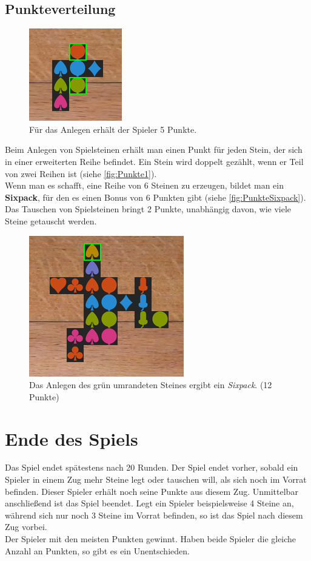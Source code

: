 \documentclass[a4paper, ngerman]{scrartcl}
\begin{document}
\subsection{Punkteverteilung}
\begin{figure}
	\centering	
		\includegraphics[scale = 0.7]{images/anlegen04}
		\caption{Für das Anlegen erhält der Spieler 5 Punkte.}
		\label{fig:Punkte1}	
\end{figure}
Beim Anlegen von Spielsteinen erhält man einen Punkt für jeden Stein, der sich in einer erweiterten Reihe befindet. Ein Stein wird doppelt gezählt, wenn er Teil von zwei Reihen ist (siehe \autoref{fig:Punkte1}).\\
Wenn man es schafft, eine Reihe von 6 Steinen zu erzeugen, bildet man ein \textbf{Sixpack}, für den es einen Bonus von 6 Punkten gibt (siehe \autoref{fig:PunkteSixpack}).\\
Das Tauschen von Spielsteinen bringt 2 Punkte, unabhängig davon, wie viele Steine getauscht werden.
\vspace{30pt}
\begin{figure}[h]
\centering
	\includegraphics[scale = 0.6]{images/sixpack_legen}
		\caption{Das Anlegen des grün umrandeten Steines ergibt ein \emph{Sixpack}. (12 Punkte)}
		\label{fig:PunkteSixpack}	
\end{figure}

\newpage
	
\section{Ende des Spiels}
\label{sec:gameOver}
Das Spiel endet spätestens nach 20 Runden. Der Spiel endet vorher, sobald ein Spieler in einem Zug mehr Steine legt oder tauschen will, als sich noch im Vorrat befinden. Dieser Spieler erhält noch seine Punkte aus diesem Zug. Unmittelbar anschließend ist das Spiel beendet. Legt ein Spieler beispielsweise 4 Steine an, während sich nur noch 3 Steine im Vorrat befinden, so ist das Spiel nach diesem Zug vorbei.\\
Der Spieler mit den meisten Punkten gewinnt. Haben beide Spieler die gleiche Anzahl an Punkten, so gibt es ein Unentschieden.
\end{document}
